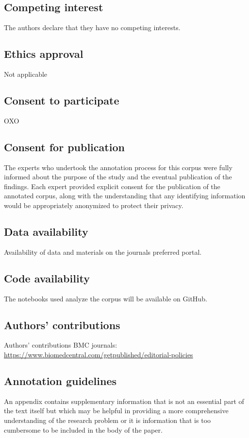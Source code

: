 \documentclass[sn-mathphys,Numbered]{sn-jnl}%
\theoremstyle{thmstyleone}%
\theoremstyle{thmstyletwo}%
\theoremstyle{thmstylethree}%
\begin{document}
\subsection*{Competing interest}
%
The authors declare that they have no competing interests.
%
%
%
\subsection*{Ethics approval}
%
Not applicable
%
%
%
\subsection*{Consent to participate}
%
OXO
%
%
%
\subsection*{Consent for publication}
%
The experts who undertook the annotation process for this corpus were fully informed about the purpose of the study and the eventual publication of the findings.
Each expert provided explicit consent for the publication of the annotated corpus, along with the understanding that any identifying information would be appropriately anonymized to protect their privacy. 
%
%
%
\subsection*{Data availability}
%
Availability of data and materials on the journals preferred portal.
%
%
%
\subsection*{Code availability}
%
The notebooks used analyze the corpus will be available on GitHub.
%
%
%
\subsection*{Authors' contributions}
%
Authors' contributions
BMC journals: \url{https://www.biomedcentral.com/getpublished/editorial-policies}
%
%
%
%
\begin{appendices}
%
%
%
\section{Annotation guidelines}\label{annot_guidelines}
%
An appendix contains supplementary information that is not an essential part of the text itself but which may be helpful in providing a more comprehensive understanding of the research problem or it is information that is too cumbersome to be included in the body of the paper.
%
%
%
\end{appendices}
\end{document}
